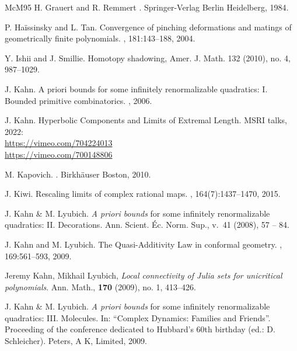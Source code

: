 \documentclass[11pt, reqno]{amsart}
\numberwithin{equation}{section}
\theoremstyle{plain}
\theoremstyle{theorem}
\theoremstyle{plain}
\theoremstyle{definition}
\numberwithin{figure}{section}
\begin{document}
\begin{thebibliography}{McM95}
H. Grauert and R. Remmert
.
\newblock Springer-Verlag Berlin Heidelberg, 1984.

P. Ha{\"i}ssinsky and L. Tan.
\newblock Convergence of pinching deformations and matings of geometrically
  finite polynomials.
, 181:143--188, 2004.

 Y. Ishii and J. Smillie. Homotopy shadowing, Amer. J. Math. 132 (2010), no. 4,
987--1029.



J. Kahn.
\newblock A priori bounds for some infinitely renormalizable quadratics: I. Bounded primitive combinatorics.
, 2006.

 J. Kahn. Hyperbolic Components and Limits of Extremal Length. MSRI talks, 2022:
\\ \href{https://vimeo.com/704224013}{https://vimeo.com/704224013}
\\ \href{https://vimeo.com/700148806}{https://vimeo.com/700148806}



M. Kapovich.
.
\newblock Birkh\"auser Boston, 2010.

J. Kiwi.
\newblock Rescaling limits of complex rational maps.
, 164(7):1437--1470, 2015.


 J. Kahn \& M. Lyubich. {\it A priori bounds} for some infinitely
renormalizable quadratics: II.  Decorations.
Ann. Scient. \'Ec. Norm. Sup., v.~41 (2008), 57 -- 84.



J. Kahn and M. Lyubich.
\newblock The Quasi-Additivity Law in conformal geometry.
, 169:561--593, 2009.

 Jeremy Kahn, Mikhail Lyubich, \emph{Local connectivity of Julia sets for unicritical polynomials}. Ann. Math., \textbf{170} (2009), no. 1, 413--426.


 J. Kahn \& M. Lyubich. {\it A priori bounds} for some infinitely
renormalizable quadratics: III.  Molecules.  In: ``Complex Dynamics: Families and Friends''.
    Proceeding of the conference dedicated to Hubbard's 60th birthday (ed.:  D. Schleicher). 
    Peters, A K, Limited, 2009. 


\end{thebibliography}
\end{document}

